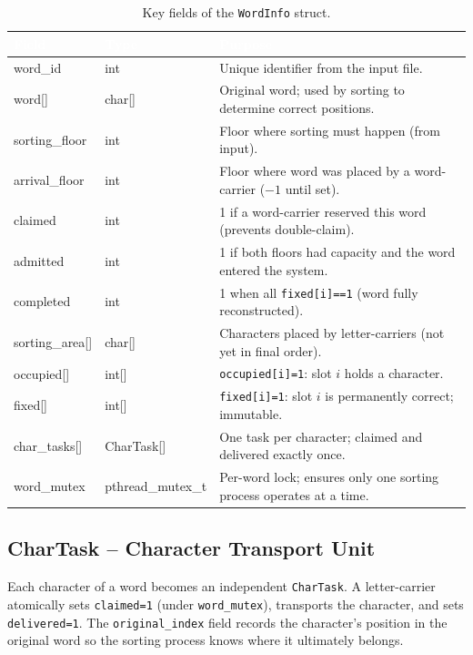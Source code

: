 \documentclass[12pt,a4paper]{article}
\newcommand{\code}[1]{\texttt{\small #1}}
\begin{document}
\begin{table}[h!]
\centering
\caption{Key fields of the \texttt{WordInfo} struct.}
\begin{tabularx}{\textwidth}{>{\ttfamily}l >{\ttfamily}l X}
\toprule
\rowcolor{darkblue}
\textcolor{white}{Field} &
\textcolor{white}{Type} &
\textcolor{white}{Purpose} \\
\midrule
word\_id        & int          & Unique identifier from the input file. \\
\rowcolor{rowgray}
word[]          & char[]       & Original word; used by sorting to determine correct positions. \\
sorting\_floor  & int          & Floor where sorting must happen (from input). \\
\rowcolor{rowgray}
arrival\_floor  & int          & Floor where word was placed by a word-carrier ($-1$ until set). \\
claimed         & int          & 1 if a word-carrier reserved this word (prevents double-claim). \\
\rowcolor{rowgray}
admitted        & int          & 1 if both floors had capacity and the word entered the system. \\
completed       & int          & 1 when all \texttt{fixed[i]==1} (word fully reconstructed). \\
\rowcolor{rowgray}
sorting\_area[] & char[]       & Characters placed by letter-carriers (not yet in final order). \\
occupied[]      & int[]        & \texttt{occupied[i]=1}: slot $i$ holds a character. \\
\rowcolor{rowgray}
fixed[]         & int[]        & \texttt{fixed[i]=1}: slot $i$ is permanently correct; immutable. \\
char\_tasks[]   & CharTask[]   & One task per character; claimed and delivered exactly once. \\
\rowcolor{rowgray}
word\_mutex     & pthread\_mutex\_t & Per-word lock; ensures only one sorting process operates at a time. \\
\bottomrule
\end{tabularx}
\end{table}

\subsection{CharTask -- Character Transport Unit}

Each character of a word becomes an independent \code{CharTask}. A letter-carrier
atomically sets \code{claimed=1} (under \code{word\_mutex}), transports the character,
and sets \code{delivered=1}. The \code{original\_index} field records the character's
position in the original word so the sorting process knows where it ultimately belongs.
\end{document}

